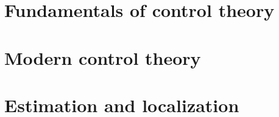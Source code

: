 \documentclass[11pt]{book}
\begin{document}
\frontmatter





\renewcommand{\chaptermark}[1]{%
  \markboth{\sffamily\normalsize\bfseries #1}
           {\sffamily\normalsize\bfseries #1}}
\renewcommand{\sectionmark}[1]{%
  \markright{\sffamily\normalsize\bfseries #1}
            {\sffamily\normalsize\bfseries #1}}



\renewcommand{\chaptermark}[1]{%
  \markboth{\sffamily\normalsize\bfseries\chaptername\ \thechapter.\ #1}{}}
\renewcommand{\sectionmark}[1]{%
  \markright{\sffamily\normalsize\thesection\hspace{5pt}#1}{}}

\newcommand*{\partpath}{}
\newcommand*{\chapterpath}{}
\newcommand*{\sectionpath}{}

\mainmatter
\setcounter{chapter}{-1}

\renewcommand*{\partpath}{introduction}


\part{Fundamentals of control theory}
\label{part:fundamentals_of_control_theory}
\renewcommand*{\partpath}{fundamentals-of-control-theory}





\part{Modern control theory}
\label{part:modern_control_theory}
\renewcommand*{\partpath}{modern-control-theory}





\part{Estimation and localization}
\label{part:estimation_and_localization}
\renewcommand*{\partpath}{estimation-and-localization}


\end{document}
